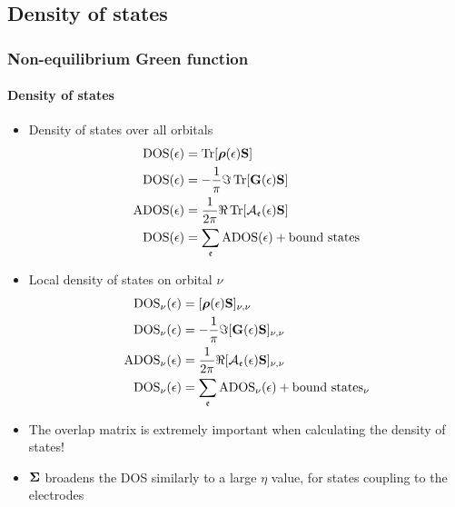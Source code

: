 \subsection{Density of states}

\begin{frame}[label=DOS]
  \frametitle{Non-equilibrium Green function}
  \framesubtitle{Density of states}
  
  \begin{itemize}
    \item Density of states over all orbitals
    \begin{align*}
      \mathrm{DOS}(\epsilon) &= \operatorname{Tr}[\boldsymbol{\rho}(\epsilon) \mathbf{S}]
      \\
      \mathrm{DOS}(\epsilon) &= -\frac1\pi\Im\operatorname{Tr}[\mathbf{G}(\epsilon) \mathbf{S}]
      \\
      \mathrm{ADOS}(\epsilon) &= \frac1{2\pi}\Re\operatorname{Tr}[\mathcal{A}_{\mathfrak{e}}(\epsilon) \mathbf{S}]
      \\
      \mathrm{DOS}(\epsilon) &=\sum_{\mathfrak{e}} \mathrm{ADOS}(\epsilon) + \text{bound states}
    \end{align*}

    \vspace{-2ex}

    \item Local density of states on orbital $\nu$
    \begin{align*}
      \mathrm{DOS}_\nu(\epsilon) &= [\boldsymbol{\rho}(\epsilon) \mathbf{S}]_{\nu,\nu}
      \\
      \mathrm{DOS}_\nu(\epsilon) &= -\frac1\pi\Im[\mathbf{G}(\epsilon) \mathbf{S}]_{\nu,\nu}
      \\
      \mathrm{ADOS}_\nu(\epsilon) &= \frac1{2\pi}\Re[\mathcal{A}_{\mathfrak{e}}(\epsilon) \mathbf{S}]_{\nu,\nu}
      \\
      \mathrm{DOS}_\nu(\epsilon) &=\sum_{\mathfrak{e}} \mathrm{ADOS}_\nu(\epsilon) + \text{bound states}_\nu
    \end{align*}

    \vspace{-2ex}

    \item<2->%
    The overlap matrix is extremely important when calculating the density of states!

    \item<3->%
    $\boldsymbol{\Sigma}$ broadens the DOS similarly to a large $\eta$ value, for states
    coupling to the electrodes
    
  \end{itemize}


\end{frame}


